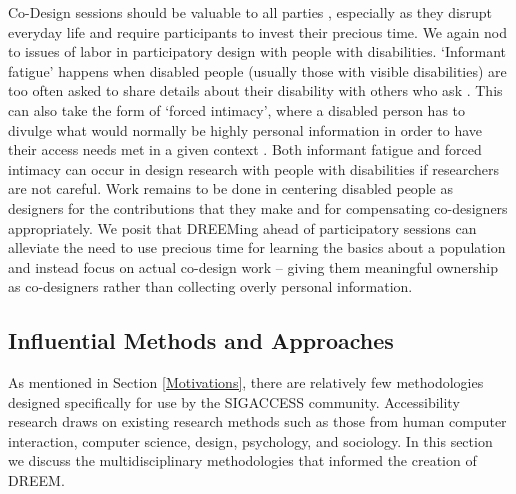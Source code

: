 Co-Design sessions should be valuable to all parties \cite{bodkerParticipatoryDesignThat2018}, especially as they disrupt everyday life and require participants to invest their precious time. We again nod to issues of labor in participatory design with people with disabilities. `Informant fatigue' happens when disabled people (usually those with visible disabilities) are too often asked to share details about their disability with others who ask \cite{shinoharaSelfConsciousSelfConfidentDiary2016}. This can also take the form of `forced intimacy', where a disabled person has to divulge what would normally be highly personal information in order to have their access needs met in a given context \cite{mingusForcedIntimacyAbleist2017}. Both informant fatigue and forced intimacy can occur in design research with people with disabilities if researchers are not careful. Work remains to be done in centering disabled people as designers for the contributions that they make \cite{bennettBiographicalPrototypesReimagining2019} and for compensating co-designers appropriately. We posit that DREEMing ahead of participatory sessions can alleviate the need to use precious time for learning the basics about a population and instead focus on actual co-design work -- giving them meaningful ownership as co-designers rather than collecting overly personal information.
			
\subsection{Influential Methods and Approaches}\label{influences}
As mentioned in Section \ref{Motivations}, there are relatively few methodologies designed specifically for use by the SIGACCESS community. Accessibility research draws on existing research methods such as those from human computer interaction, computer science, design, psychology, and sociology. In this section we discuss the multidisciplinary methodologies that informed the creation of DREEM. 

